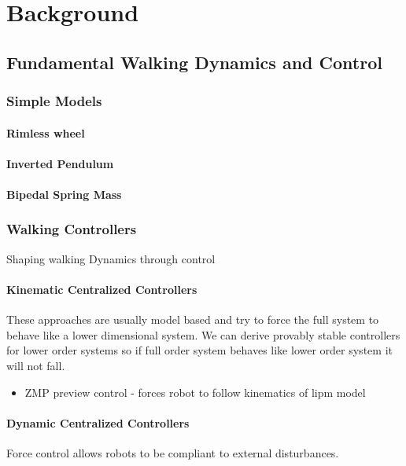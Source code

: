 \chapter{Background}

\section{Fundamental Walking Dynamics and Control}
\subsection{Simple Models}
\subsubsection{Rimless wheel}
\subsubsection{Inverted Pendulum}
\subsubsection{Bipedal Spring Mass}

\subsection{Walking Controllers}
Shaping walking Dynamics through control

\subsubsection{Kinematic Centralized Controllers}

These approaches are usually model based and try to force the full system to
behave like a lower dimensional system. We can derive provably stable
controllers for lower order systems so if full order system behaves like lower
order system it will not fall.

\begin{itemize}
    \item ZMP preview control - forces robot to follow kinematics of lipm
    model
\end{itemize}

\subsubsection{Dynamic Centralized Controllers}
Force control allows robots to be compliant to external disturbances.

